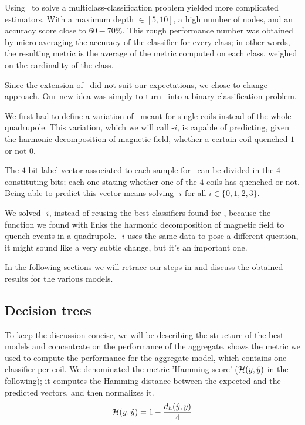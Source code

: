 Using \dts\ to solve a multiclass-classification problem yielded more complicated estimators. With a
maximum depth $\in [5, 10]$, a high number of nodes, and an accuracy score close to $60 - 70\%$. This rough performance
number was obtained by micro averaging the accuracy of the classifier for every class; in other
words, the resulting metric is the average of the metric computed on each class, weighed on the cardinality of the class.

Since the extension of \dts\ did not suit our expectations, we chose to change approach. Our new
idea was simply to turn \qlp\ into a binary classification problem.

We first had to define a variation of \qrp\ meant for single coils instead of the whole quadrupole. This variation, which we will call \qrp-$i$, is capable of predicting, given the harmonic decomposition of magnetic field, whether a certain coil quenched $1$ or not $0$.

The $4$ bit label vector associated to each sample for \qlp\ can be divided in the $4$ constituting
bits; each one stating whether one of the $4$ coils has quenched or not. Being able to predict this vector means
solving \qrp-$i$ for all $i \in \{0, 1, 2, 3\}$.

We solved \qrp-$i$, instead of reusing the best classifiers found for \qrp, because the function we found with
\qrp links the harmonic decomposition of magnetic field to quench events in a quadrupole. \qrp-$i$
uses the same data to pose a different question, it might sound like a very subtle change, but it's
an important one.

In the following sections we will retrace our steps in  and discuss the obtained results for the various models.

\subsection{Decision trees}
To keep the discussion concise, we will be describing the structure of the best models and
concentrate on the performance of the aggregate.  shows the metric we used to
compute the performance for the aggregate model, which contains one classifier per coil. We
denominated the metric 'Hamming score' ($\mathcal{H}(y, \hat{y})$ in the following); it computes the Hamming distance between the expected and the predicted vectors, and then normalizes it.
\begin{equation}
	\label{eq:hamming}
	\mathcal{H}(y, \hat{y}) = 1 - \frac{d_h(\hat{y}, y)}{4}
\end{equation}

